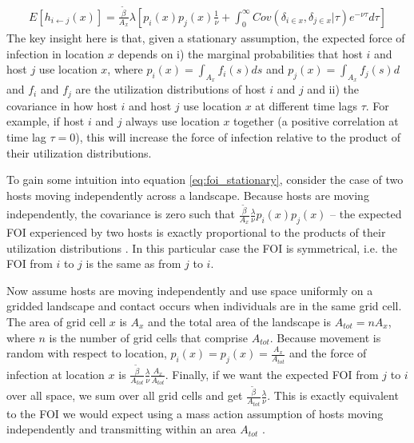 \documentclass[letterpaper]{article}
\begin{document}
\begin{equation}
    \begin{aligned}
    E[h_{i \leftarrow j}(x)] = \frac{\tilde{\beta}}{A_x} \lambda [p_i(x)p_j(x) \frac{1}{\nu} + \int_{0}^{\infty} Cov(\delta_{i \in x}, \delta_{j \in x} | \tau) e^{-\nu \tau} d\tau]
    \end{aligned}
    \label{eq:foi_stationary}
\end{equation}
The key insight here is that, given a stationary assumption, the expected force of infection in location $x$ depends on i) the marginal probabilities that host $i$ and host $j$ use location $x$, where $p_i(x) = \int_{A_x} f_i(s) ds$ and $p_j(x) = \int_{A_x} f_j(s) d$ and $f_i$ and $f_j$ are the utilization distributions of host $i$ and $j$ and ii) the covariance in how host $i$ and host $j$ use location $x$ at different time lags $\tau$. For example, if host $i$ and $j$ always use location $x$ together (a positive correlation at time lag $\tau = 0$), this will increase the force of infection relative to the product of their utilization distributions.  

To gain some intuition into equation \ref{eq:foi_stationary}, consider the case of two hosts moving independently across a landscape.  Because hosts are moving independently, the covariance is zero such that $\frac{\tilde{\beta}}{A_x} \frac{\lambda}{\nu} p_i(x)p_j(x)$ -- the expected FOI experienced by two hosts is exactly proportional to the products of their utilization distributions \citep[similar to the result given in][]{Noonan2021}.  In this particular case the FOI is symmetrical, i.e. the FOI from $i$ to $j$ is the same as from $j$ to $i$.

Now assume hosts are moving independently and use space uniformly on a gridded landscape and contact occurs when individuals are in the same grid cell.  The area of grid cell $x$ is $A_x$ and the total area of the landscape is $A_{tot} = n A_x$, where $n$ is the number of grid cells that comprise $A_{tot}$. Because movement is random with respect to location, $p_i(x) = p_j(x) = \frac{A_x}{A_{tot}}$ and the force of infection at location $x$ is $\frac{\tilde{\beta}}{A_{tot}} \frac{\lambda}{\nu} \frac{A_x}{A_{tot}}$.  Finally, if we want the expected FOI from $j$ to $i$ over all space, we sum over all grid cells and get $\frac{\tilde{\beta}}{A_{tot}} \frac{\lambda}{\nu}$. This is exactly equivalent to the FOI we would expect using a mass action assumption of hosts moving independently and transmitting within an area $A_{tot}$ \citep{McCallum2001}.
\end{document}
